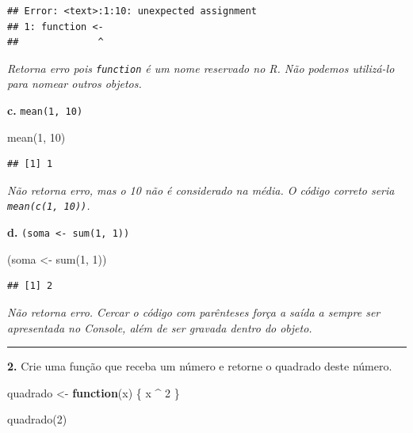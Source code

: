 \documentclass[
]{book}
\newenvironment{Shaded}{\begin{snugshade}}{\end{snugshade}}
\newcommand{\ControlFlowTok}[1]{\textcolor[rgb]{0.13,0.29,0.53}{\textbf{#1}}}
\newcommand{\DecValTok}[1]{\textcolor[rgb]{0.00,0.00,0.81}{#1}}
\newcommand{\FunctionTok}[1]{\textcolor[rgb]{0.00,0.00,0.00}{#1}}
\newcommand{\NormalTok}[1]{#1}
\newcommand{\OtherTok}[1]{\textcolor[rgb]{0.56,0.35,0.01}{#1}}
\newcommand{\SpecialCharTok}[1]{\textcolor[rgb]{0.00,0.00,0.00}{#1}}
\begin{document}
\begin{verbatim}
## Error: <text>:1:10: unexpected assignment
## 1: function <-
##              ^
\end{verbatim}

\emph{Retorna erro pois \texttt{function} é um nome reservado no R. Não podemos utilizá-lo para nomear outros objetos.}

\textbf{c.} \texttt{mean(1,\ 10)}

\begin{Shaded}
\begin{Highlighting}[]
\FunctionTok{mean}\NormalTok{(}\DecValTok{1}\NormalTok{, }\DecValTok{10}\NormalTok{)}
\end{Highlighting}
\end{Shaded}

\begin{verbatim}
## [1] 1
\end{verbatim}

\emph{Não retorna erro, mas o 10 não é considerado na média. O código correto seria \texttt{mean(c(1,\ 10))}.}

\textbf{d.} \texttt{(soma\ \textless{}-\ sum(1,\ 1))}

\begin{Shaded}
\begin{Highlighting}[]
\NormalTok{(soma }\OtherTok{\textless{}{-}} \FunctionTok{sum}\NormalTok{(}\DecValTok{1}\NormalTok{, }\DecValTok{1}\NormalTok{))}
\end{Highlighting}
\end{Shaded}

\begin{verbatim}
## [1] 2
\end{verbatim}

\emph{Não retorna erro. Cercar o código com parênteses força a saída a sempre ser apresentada no Console, além de ser gravada dentro do objeto.}

\begin{center}\rule{0.5\linewidth}{0.5pt}\end{center}

\textbf{2.} Crie uma função que receba um número e retorne o quadrado deste número.

\begin{Shaded}
\begin{Highlighting}[]
\NormalTok{quadrado }\OtherTok{\textless{}{-}} \ControlFlowTok{function}\NormalTok{(x) \{}
\NormalTok{  x }\SpecialCharTok{\^{}} \DecValTok{2}
\NormalTok{\}}

\FunctionTok{quadrado}\NormalTok{(}\DecValTok{2}\NormalTok{)}
\end{Highlighting}
\end{Shaded}
\end{document}
